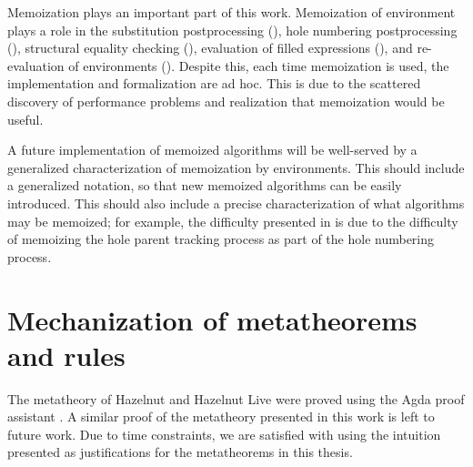 Memoization plays an important part of this work. Memoization of environment plays a role in the substitution postprocessing (), hole numbering postprocessing (), structural equality checking (), evaluation of filled expressions (), and re-evaluation of environments (). Despite this, each time memoization is used, the implementation and formalization are ad hoc. This is due to the scattered discovery of performance problems and realization that memoization would be useful.

A future implementation of memoized algorithms will be well-served by a generalized characterization of memoization by environments. This should include a generalized notation, so that new memoized algorithms can be easily introduced. This should also include a precise characterization of what algorithms may be memoized; for example, the difficulty presented in  is due to the difficulty of memoizing the hole parent tracking process as part of the hole numbering process.

\section{Mechanization of metatheorems and rules}
\label{sec:formalization}

The metatheory of Hazelnut and Hazelnut Live were proved using the Agda proof assistant \cite{agda2017,agda-dynamics}. A similar proof of the metatheory presented in this work is left to future work. Due to time constraints, we are satisfied with using the intuition presented as justifications for the metatheorems in this thesis.

